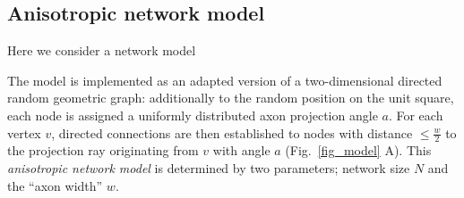 

\subsection*{Anisotropic network model}

Here we consider a network model

The model is implemented as an adapted version of a two-dimensional
directed random geometric graph: additionally to the random position
on the unit square, each node is assigned a uniformly distributed axon
projection angle $a$. For each vertex $v$, directed connections are
then established to nodes with distance $\leq \frac{w}{2}$ to the
projection ray originating from $v$ with angle $a$
(Fig.~\ref{fig_model} A). This \textit{anisotropic network
  model} is determined by two parameters; network size $N$ and the
\enquote{axon width} $w$.
